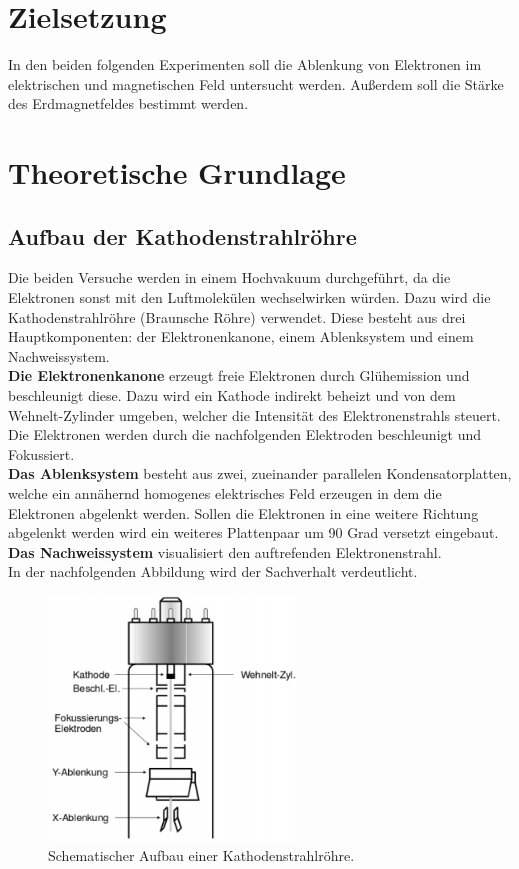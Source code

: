 \section{Zielsetzung}
In den beiden folgenden Experimenten soll die Ablenkung von Elektronen im elektrischen und magnetischen Feld untersucht werden. Außerdem soll die Stärke des Erdmagnetfeldes bestimmt werden.

\section{Theoretische Grundlage}
\label{sec:Theorie}
\subsection{Aufbau der Kathodenstrahlröhre}
Die beiden Versuche werden in einem Hochvakuum durchgeführt, da die Elektronen sonst mit den Luftmolekülen wechselwirken würden. Dazu wird die Kathodenstrahlröhre (Braunsche Röhre) verwendet. Diese besteht aus drei Hauptkomponenten: der Elektronenkanone, einem Ablenksystem und einem Nachweissystem.\\
\textbf{Die Elektronenkanone} erzeugt freie Elektronen durch Glühemission und beschleunigt diese. Dazu wird ein Kathode indirekt beheizt und von dem Wehnelt-Zylinder umgeben, welcher die Intensität des Elektronenstrahls steuert. Die Elektronen werden durch die nachfolgenden Elektroden beschleunigt und Fokussiert. \\
\textbf{Das Ablenksystem} besteht aus zwei, zueinander parallelen Kondensatorplatten, welche ein annähernd homogenes elektrisches Feld erzeugen in dem die Elektronen abgelenkt werden. Sollen die Elektronen in eine weitere Richtung abgelenkt werden wird ein weiteres Plattenpaar um 90 Grad versetzt eingebaut. \\
\textbf{Das Nachweissystem} visualisiert den auftrefenden Elektronenstrahl.\\
In der nachfolgenden Abbildung wird der Sachverhalt verdeutlicht.

\begin{figure}[H]
	\centering
	\includegraphics[height=6.5cm]{picture/Kathodenstrahlroehre.PNG}
	\caption{Schematischer Aufbau einer Kathodenstrahlröhre. \cite[2]{V501}}
	\label{fig:Kathode}
\end{figure}

